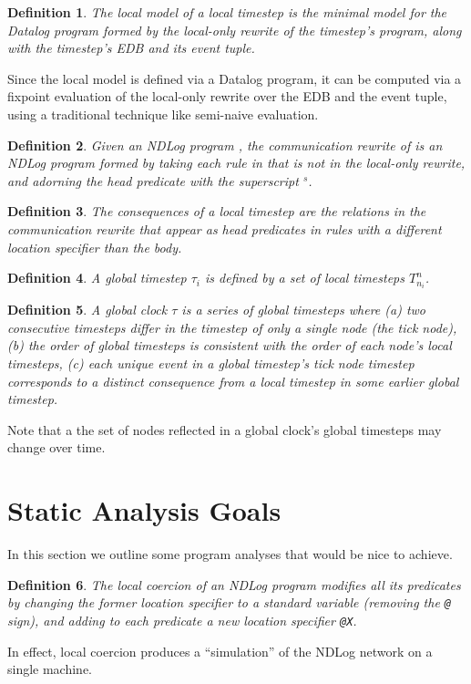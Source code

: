 \documentclass{article}
\newtheorem{defn}{Definition}
\begin{document}
  
\begin{defn}
  The {\em local model} of a local timestep is the minimal model for
  the Datalog program formed by the local-only rewrite of the timestep's
  program, along with the timestep's EDB and its event tuple.
\end{defn}
Since the local model is defined via a Datalog program, it can be
computed via a fixpoint evaluation of the local-only rewrite over the
EDB and the event tuple, using a traditional technique like semi-naive
evaluation.

\begin{defn}
  Given an NDLog program , the {\em communication rewrite} of
   is an NDLog program formed by taking each rule in 
  that is not in the local-only rewrite, and adorning the head predicate
  with the superscript {${}^s$}.
\end{defn}

\begin{defn}
  The {\em consequences} of a local timestep are the relations in the
  communication rewrite that appear as head predicates in rules with
  a different location specifier than the body.
\end{defn}

\begin{defn}
  A {\em global timestep} $\tau_i$ is defined by a set of local
  timesteps $T^n_{n_i}$.
\end{defn}

\begin{defn}
  A {\em global clock} $\tau$ is a series of global timesteps where
  (a) two consecutive timesteps differ in the timestep of only a
  single node (the {\em tick node}), (b) the order of global timesteps
  is consistent with the order of each node's local timesteps, (c)
  each unique event in a global timestep's tick node timestep
  corresponds to a distinct consequence from a local timestep in some
  earlier global timestep.
\end{defn}
Note that a the set of nodes reflected in a global clock's global
timesteps may change over time.

\section{Static Analysis Goals}
In this section we outline some program analyses that would be nice to
achieve.

\begin{defn} 
The {\em local coercion} of an NDLog program modifies all its
predicates by changing the former location specifier to a standard
variable (removing the {\tt @} sign), and adding to each predicate a
new location specifier {\tt @X}.
\end{defn}
In effect, local coercion produces a ``simulation'' of the NDLog
network on a single machine.
\end{document}
